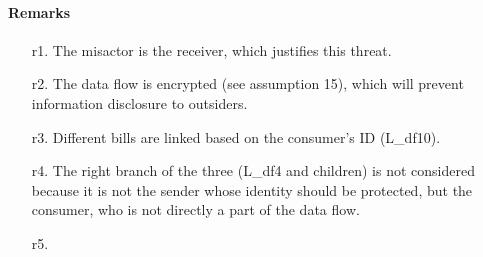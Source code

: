 \paragraph{Remarks}
\begin{enumerate}
	\item[r1.] The misactor is the receiver, which justifies this threat.
	\item[r2.] The data flow is encrypted (see assumption 15), which will prevent
	information disclosure to outsiders.
	\item[r3.] Different bills are linked based on the consumer's ID (L\_df10). 
	\item[r4.] The right branch of the three (L\_df4 and children) is not
	considered because it is not the sender whose identity should be protected, but the
	consumer, who is not directly a part of the data flow.
	\item[r5.] 
\end{enumerate}
